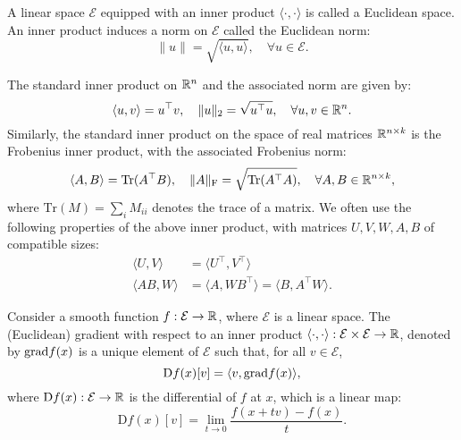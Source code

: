 \begin{definition}
    A linear space $\mathcal{E}$ equipped with an inner product $\langle \cdot, \cdot \rangle$ is called a Euclidean space. An inner product induces a norm on $\mathcal{E}$ called the Euclidean norm:
    \[
        \lVert u \rVert = \sqrt{\langle u, u \rangle}, \quad \forall u \in \mathcal{E}.
    \]
\end{definition}
The standard inner product on $\mathbb{R}^n$ and the associated norm are given by:
\begin{equation}\label{eq:std_inner}
    \langle u, v \rangle = u^\top v, \quad \lVert u \rVert_2 = \sqrt{u^\top u}, \quad \forall u,v \in \mathbb{R}^n.
\end{equation}
Similarly, the standard inner product on the space of real matrices $\mathbb{R}^{n \times k}$ is the Frobenius inner product, with the associated Frobenius norm:
\begin{equation}\label{eq:fro_inner}
    \langle A, B \rangle = \textrm{Tr}(A^\top B), \quad \lVert A \rVert_{\mathrm{F}} = \sqrt{\textrm{Tr}(A^\top A)}, \quad \forall A,B \in \mathbb{R}^{n \times k},
\end{equation}
where $\textrm{Tr}(M) = \sum_{i} M_{ii}$ denotes the trace of a matrix. We often use the following properties of the above inner product, with matrices $U, V, W, A, B$ of compatible sizes:
\begin{equation}
    \begin{split}
        \langle U, V  \rangle &= \langle U^\top, V^\top \rangle \\
        \langle A B, W \rangle &= \langle A, W B^\top \rangle = \langle B, A^\top W \rangle.
    \end{split}
\end{equation}

\begin{definition}[Gradient]
    Consider a smooth function $f: \mathcal{E} \to \mathbb{R}$, where $\mathcal{E}$ is a linear space. The (Euclidean) gradient with respect to an inner product $\langle \cdot, \cdot \rangle: \mathcal{E} \times \mathcal{E} \to \mathbb{R}$, denoted by $\mathrm{grad }{f}(x)$ is a unique element of $\mathcal{E}$ such that, for all $v \in \mathcal{E}$, 
    \[
        \textrm{D}f(x)[v] = \langle v, \mathrm{grad }{f}(x) \rangle,
    \]
    where $\textrm{D}f(x) : \mathcal{E} \to \mathbb{R}$ is the differential of $f$ at $x$, which is a linear map:
    \[
        \textrm{D}f(x)[v] = \lim_{t \to 0} \frac{f(x + tv) - f(x)}{t}.
    \]
\end{definition}

